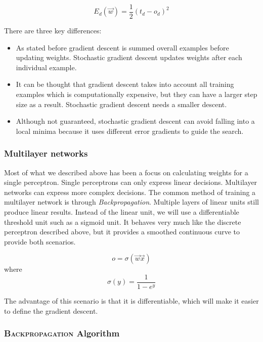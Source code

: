 \documentclass[titlepage,11pt]{article}
\begin{document}
\begin{equation}
E_d(\vec{w})=\frac{1}{2} (t_d - o_d)^2
\end{equation}

There are three key differences:

\begin{itemize}
\item As stated before gradient descent is summed overall examples before updating weights. Stochastic gradient descent updates weights after each individual example.
\item It can be thought that gradient descent takes into account all training examples which is computationally expensive, but they can have a larger step size as a result. Stochastic gradient descent needs a smaller descent.
\item Although not guaranteed, stochastic gradient descent can avoid falling into a local minima because it uses different error gradients to guide the search.
\end{itemize}

\subsubsection{Multilayer networks}

Most of what we described above has been a focus on calculating weights for a single perceptron. Single perceptrons can only express linear decisions. Multilayer networks can express more complex decisions. The common method of training a multilayer network is through \textit{Backpropagation}. Multiple layers of linear units still produce linear results. Instead of the linear unit, we will use a differentiable threshold unit such as a sigmoid unit. It behaves very much like the discrete perceptron described above, but it provides a smoothed continuous curve to provide both scenarios.

\begin{equation}
o = \sigma (\vec{w} \vec{x})
\end{equation}
where
\begin{equation}
\sigma(y) = \frac{1}{1-e^y}
\end{equation}

The advantage of this scenario is that it is differentiable, which will make it easier to define the gradient descent.

\subsubsection*{\textsc{Backpropagation} Algorithm}
\end{document}
